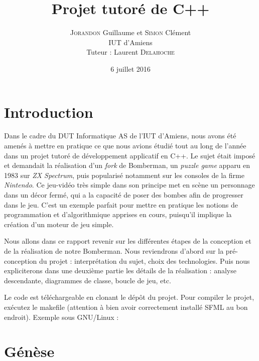 \documentclass[a4paper,10pt]{report}
\title{Projet tutoré de C++}
\author{\textsc{Jorandon} Guillaume et \textsc{Simon} Clément\\\normalsize{IUT d'Amiens}\\\normalsize{Tuteur : Laurent \textsc{Delahoche}}}
\date{6 juillet 2016}
\begin{document}
\maketitle

\tableofcontents

\chapter*{Introduction}
Dans le cadre du DUT Informatique AS de l'IUT d'Amiens, nous avons été amenés à mettre en pratique ce que nous avions étudié tout au long de l'année dans un projet tutoré de développement applicatif en C++. Le sujet était imposé et demandait la réalisation d'un \textit{fork} de Bomberman, un \textit{puzzle game} apparu en 1983 sur \textit{ZX Spectrum}, puis popularisé notamment sur les consoles de la firme \textit{Nintendo}. Ce jeu-vidéo très simple dans son principe met en scène un personnage dans un décor fermé, qui a la capacité de poser des bombes afin de progresser dans le jeu. C'est un exemple parfait pour mettre en pratique les notions de programmation et d'algorithmique apprises en cours, puisqu'il implique la création d'un moteur de jeu simple.

Nous allons dans ce rapport revenir sur les différentes étapes de la conception et de la réalisation de notre Bomberman. Nous reviendrons d'abord sur la pré-conception du projet : interprétation du sujet, choix des technologies. Puis nous expliciterons dans une deuxième partie les détails de la réalisation : analyse descendante, diagrammes de classe, boucle de jeu, etc.

Le code est téléchargeable en clonant le dépôt du projet. Pour compiler le projet, exécutez le makefile (attention à bien avoir correctement installé SFML au bon endroit). Exemple sous GNU/Linux :


\chapter{Génèse}
\end{document}
